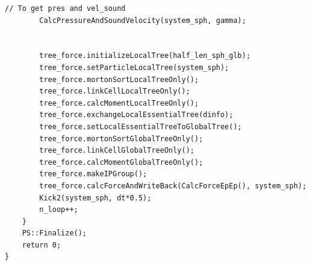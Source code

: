 \begin{lstlisting}[caption=SPHサンプル使用]
        // To get pres and vel_sound
        CalcPressureAndSoundVelocity(system_sph, gamma);


        tree_force.initializeLocalTree(half_len_sph_glb);
        tree_force.setParticleLocalTree(system_sph);
        tree_force.mortonSortLocalTreeOnly();
        tree_force.linkCellLocalTreeOnly();
        tree_force.calcMomentLocalTreeOnly();
        tree_force.exchangeLocalEssentialTree(dinfo);
        tree_force.setLocalEssentialTreeToGlobalTree();
        tree_force.mortonSortGlobalTreeOnly();
        tree_force.linkCellGlobalTreeOnly();
        tree_force.calcMomentGlobalTreeOnly();
        tree_force.makeIPGroup();
        tree_force.calcForceAndWriteBack(CalcForceEpEp(), system_sph);
        Kick2(system_sph, dt*0.5);
        n_loop++;
    }
    PS::Finalize();
    return 0;
}


\end{lstlisting}



